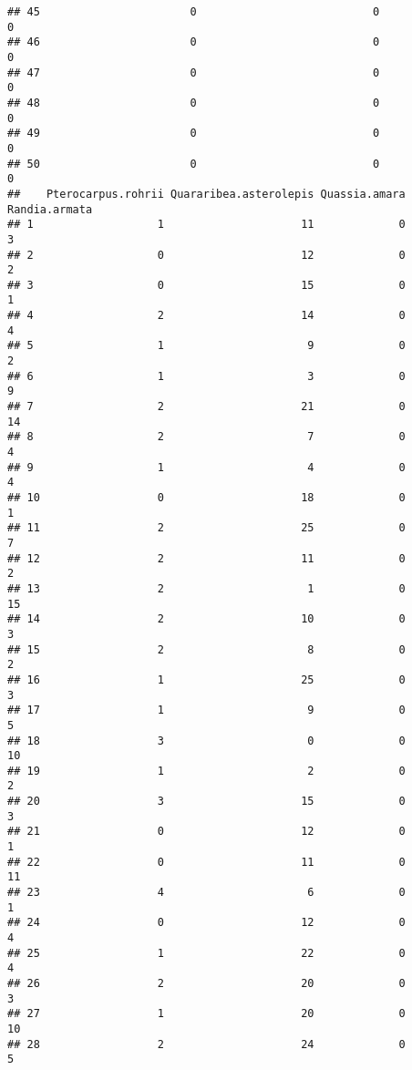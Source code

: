 \documentclass[
]{article}
\begin{document}
\begin{verbatim}
## 45                       0                           0                  0
## 46                       0                           0                  0
## 47                       0                           0                  0
## 48                       0                           0                  0
## 49                       0                           0                  0
## 50                       0                           0                  0
##    Pterocarpus.rohrii Quararibea.asterolepis Quassia.amara Randia.armata
## 1                   1                     11             0             3
## 2                   0                     12             0             2
## 3                   0                     15             0             1
## 4                   2                     14             0             4
## 5                   1                      9             0             2
## 6                   1                      3             0             9
## 7                   2                     21             0            14
## 8                   2                      7             0             4
## 9                   1                      4             0             4
## 10                  0                     18             0             1
## 11                  2                     25             0             7
## 12                  2                     11             0             2
## 13                  2                      1             0            15
## 14                  2                     10             0             3
## 15                  2                      8             0             2
## 16                  1                     25             0             3
## 17                  1                      9             0             5
## 18                  3                      0             0            10
## 19                  1                      2             0             2
## 20                  3                     15             0             3
## 21                  0                     12             0             1
## 22                  0                     11             0            11
## 23                  4                      6             0             1
## 24                  0                     12             0             4
## 25                  1                     22             0             4
## 26                  2                     20             0             3
## 27                  1                     20             0            10
## 28                  2                     24             0             5

\end{verbatim}
\end{document}
